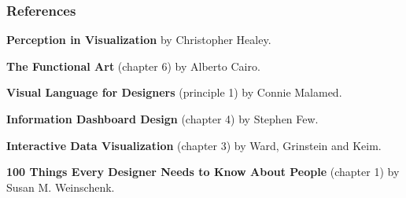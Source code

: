 \documentclass[12pt]{beamer}\usepackage[]{graphicx}\usepackage[]{color}
\begin{document}

\begin{frame}
\frametitle{References}

\bbi
  \item \textbf{Perception in Visualization} by Christopher Healey.
  \item \textbf{The Functional Art} (chapter 6) by Alberto Cairo.
  \item \textbf{Visual Language for Designers} (principle 1) by Connie Malamed.
  \item \textbf{Information Dashboard Design} (chapter 4) by Stephen Few.
  \item \textbf{Interactive Data Visualization} (chapter 3) by Ward, Grinstein
  and Keim.
  \item \textbf{100 Things Every Designer Needs to Know About People} 
  (chapter 1) by Susan M. Weinschenk.
\ei

\end{frame}

\end{document}
